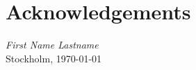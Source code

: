

\cleartorecto
\chapter{Acknowledgements}
\lipsum[1-2]



\medskip
{\begin{flushright}
    \textit{First Name Lastname}\\
    Stockholm, \today
\end{flushright}}
